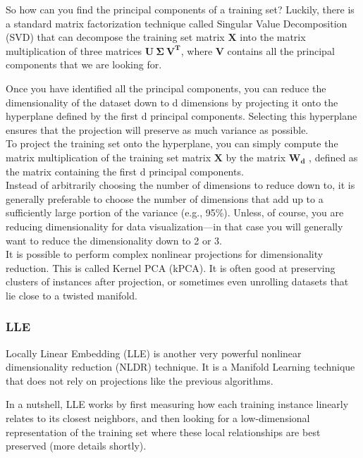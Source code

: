 \documentclass[french]{article}
\begin{document}
So how can you find the principal components of a training set? Luckily, there is a standard matrix factorization technique called Singular Value Decomposition (SVD) that can decompose the training set matrix $\bm{X}$ into the matrix multiplication of three matrices $\bm{U\ \Sigma\ V^T}$, where $\bm{V}$ contains all the principal components that we are looking for.

Once you have identified all the principal components, you can reduce the dimensionality of the dataset down to d dimensions by projecting it onto the hyperplane defined by the first d principal components. Selecting this hyperplane ensures that the projection will preserve as much variance as possible.\\

To project the training set onto the hyperplane, you can simply compute the matrix multiplication of the training set matrix $\bm{X}$ by the matrix $\bm{W_d}$ , defined as the matrix containing the first d principal components.\\

Instead of arbitrarily choosing the number of dimensions to reduce down to, it is generally preferable to choose the number of dimensions that add up to a sufficiently large portion of the variance (e.g., 95\%). Unless, of course, you are reducing dimensionality for data visualization—in that case you will generally want to reduce the dimensionality down to 2 or 3.\\

It is possible to perform complex nonlinear projections for dimensionality reduction. This is called Kernel PCA (kPCA).  It is often good at preserving clusters of instances after projection, or sometimes even unrolling datasets that lie close to a twisted manifold.

\subsubsection{LLE}

Locally Linear Embedding (LLE) is another very powerful nonlinear dimensionality reduction (NLDR) technique.  It is a Manifold Learning technique that does not rely on projections like the previous algorithms.

In a nutshell, LLE works by first measuring how each training instance linearly relates to its closest neighbors, and then looking for a low-dimensional representation of the training set where these local relationships are best preserved (more details shortly).\\
\end{document}

